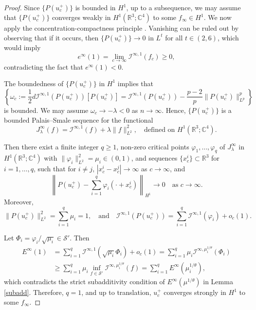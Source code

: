 \documentclass{amsart}
\theoremstyle{plain}
\theoremstyle{definition}
\theoremstyle{remark}
\numberwithin{equation}{section} \numberwithin{figure}{section}
\begin{document}
\begin{proof}
  Since \(\{P(u_c^+)\}\) is bounded in \(H^1\), up to a subsequence, we may assume that \(\{P(u_c^+)\}\) converges weakly in \(H^1(\mathbb{R}^3; \mathbb{C}^4)\) to some \(f_\infty \in H^1\). We now apply the concentration-compactness principle \cite{MR778970, MR778974}. Vanishing can be ruled out by observing that if it occurs, then \(\{P(u_c^+)\} \to 0\) in \(L^t\) for all \(t \in (2,6)\), which would imply
  \[
  e^{\infty}(1) = \lim_{c \to \infty} \mathcal{I}^{\infty,1}(f_c) \geq 0,
  \]
  contradicting the fact that \(e^{\infty}(1) < 0\).

  The boundedness of \(\{P(u_c^+)\}\) in \(H^1\) implies that
  \[
  \left\{ \omega_c := \frac{1}{2} d\mathcal{I}^{\infty,1}(P(u_c^+))[P(u_c^+)] = \mathcal{I}^{\infty,1}(P(u_c^+)) - \frac{p-2}{p} \|P(u_c^+)\|_{L^p}^p \right\}
  \]
  is bounded. We may assume \(\omega_c \to -\lambda < 0\) as \(n \to \infty\). Hence, \(\{P(u_c^+)\}\) is a bounded Palais–Smale sequence for the functional
  \[
  J_\lambda^\infty(f) = \mathcal{I}^{\infty,1}(f) + \lambda \|f\|_{L^2}^2, \quad \text{defined on } H^1(\mathbb{R}^3; \mathbb{C}^4).
  \]

  Then there exist a finite integer \(q \geq 1\), non-zero critical points \(\varphi_1, \dots, \varphi_q\) of \(J_\lambda^\infty\) in \(H^1(\mathbb{R}^3; \mathbb{C}^4)\) with \(\|\varphi_i\|_{L^2}^2 = \mu_i \in (0,1)\), and sequences \(\{x_c^i\} \subset \mathbb{R}^3\) for \(i = 1, \dots, q\), such that for \(i \neq j\), \(|x_c^i - x_c^j| \to \infty\) as \(c \to \infty\), and
  \[
  \left\| P(u_c^+) - \sum_{i=1}^q \varphi_i(\cdot + x_c^i) \right\|_{H^1} \to 0 \quad \text{as } c\to \infty.
  \]
  Moreover,
  \[
  \|P(u_c^+)\|_{L^2}^2 = \sum_{i=1}^q \mu_i = 1, \quad \text{and} \quad \mathcal{I}^{\infty,1}(P(u_c^+)) = \sum_{i=1}^q \mathcal{I}^{\infty,1}(\varphi_i) + o_c(1).
  \]

  Let \(\Phi_i = \varphi_i / \sqrt{\mu_i} \in \mathcal{S}'\). Then
  \begin{align*}
  E^\infty(1) &= \sum_{i=1}^q \mathcal{I}^{\infty,1}(\sqrt{\mu_i} \Phi_i) + o_c(1) 
               = \sum_{i=1}^q \mu_i \mathcal{I}^{\infty, \mu_i^{1/\theta}}(\Phi_i) \\
              &\geq \sum_{i=1}^q \mu_i \inf_{f \in \mathcal{S}'} \mathcal{I}^{\infty, \mu_i^{1/\theta}}(f)
               = \sum_{i=1}^q E^{\infty}(\mu_i^{1/\theta}),
  \end{align*}
  which contradicts the strict subadditivity condition of \(E^{\infty}(\mu^{1/\theta})\) in Lemma \ref{subadd}. Therefore, \(q = 1\), and up to translation, \(u_c^+\) converges strongly in \(H^1\) to some \(f_\infty\).
\end{proof}
\end{document}

